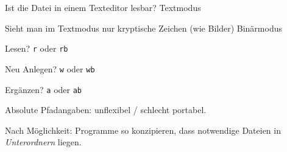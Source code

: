\begin{frame}
%
\begin{hintbox}
\small
Ist die Datei in einem Texteditor lesbar?											\tabto{10.5cm} \Thus Textmodus

Sieht man im Textmodus nur kryptische Zeichen (wie \zB Bilder)	\tabto{10.5cm} \Thus Binärmodus
\end{hintbox}
%
\begin{hintbox}
\small
Lesen?				\tabto{3cm} \Thus \texttt{r} oder \texttt{rb}

Neu Anlegen?	\tabto{3cm} \Thus \texttt{w} oder \texttt{wb}

Ergänzen?		\tabto{3cm} \Thus \texttt{a} oder \texttt{ab}
\end{hintbox}
%
\begin{hintbox}
\small
Absolute Pfadangaben: unflexibel / schlecht portabel.

Nach Möglichkeit: Programme so konzipieren, dass notwendige Dateien in \emph{Unterordnern} liegen.
\end{hintbox}
%
\end{frame}


